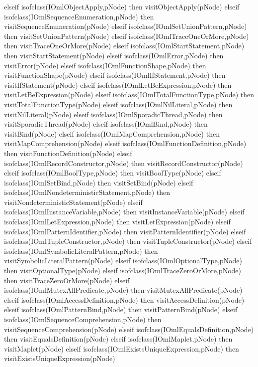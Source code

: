\begin{vdm_al}
      elseif isofclass(IOmlObjectApply,pNode) then visitObjectApply(pNode)
      elseif isofclass(IOmlSequenceEnumeration,pNode) then visitSequenceEnumeration(pNode)
      elseif isofclass(IOmlSetUnionPattern,pNode) then visitSetUnionPattern(pNode)
      elseif isofclass(IOmlTraceOneOrMore,pNode) then visitTraceOneOrMore(pNode)
      elseif isofclass(IOmlStartStatement,pNode) then visitStartStatement(pNode)
      elseif isofclass(IOmlError,pNode) then visitError(pNode)
      elseif isofclass(IOmlFunctionShape,pNode) then visitFunctionShape(pNode)
      elseif isofclass(IOmlIfStatement,pNode) then visitIfStatement(pNode)
      elseif isofclass(IOmlLetBeExpression,pNode) then visitLetBeExpression(pNode)
      elseif isofclass(IOmlTotalFunctionType,pNode) then visitTotalFunctionType(pNode)
      elseif isofclass(IOmlNilLiteral,pNode) then visitNilLiteral(pNode)
      elseif isofclass(IOmlSporadicThread,pNode) then visitSporadicThread(pNode)
      elseif isofclass(IOmlBind,pNode) then visitBind(pNode)
      elseif isofclass(IOmlMapComprehension,pNode) then visitMapComprehension(pNode)
      elseif isofclass(IOmlFunctionDefinition,pNode) then visitFunctionDefinition(pNode)
      elseif isofclass(IOmlRecordConstructor,pNode) then visitRecordConstructor(pNode)
      elseif isofclass(IOmlBoolType,pNode) then visitBoolType(pNode)
      elseif isofclass(IOmlSetBind,pNode) then visitSetBind(pNode)
      elseif isofclass(IOmlNondeterministicStatement,pNode) then visitNondeterministicStatement(pNode)
      elseif isofclass(IOmlInstanceVariable,pNode) then visitInstanceVariable(pNode)
      elseif isofclass(IOmlLetExpression,pNode) then visitLetExpression(pNode)
      elseif isofclass(IOmlPatternIdentifier,pNode) then visitPatternIdentifier(pNode)
      elseif isofclass(IOmlTupleConstructor,pNode) then visitTupleConstructor(pNode)
      elseif isofclass(IOmlSymbolicLiteralPattern,pNode) then visitSymbolicLiteralPattern(pNode)
      elseif isofclass(IOmlOptionalType,pNode) then visitOptionalType(pNode)
      elseif isofclass(IOmlTraceZeroOrMore,pNode) then visitTraceZeroOrMore(pNode)
      elseif isofclass(IOmlMutexAllPredicate,pNode) then visitMutexAllPredicate(pNode)
      elseif isofclass(IOmlAccessDefinition,pNode) then visitAccessDefinition(pNode)
      elseif isofclass(IOmlPatternBind,pNode) then visitPatternBind(pNode)
      elseif isofclass(IOmlSequenceComprehension,pNode) then visitSequenceComprehension(pNode)
      elseif isofclass(IOmlEqualsDefinition,pNode) then visitEqualsDefinition(pNode)
      elseif isofclass(IOmlMaplet,pNode) then visitMaplet(pNode)
      elseif isofclass(IOmlExistsUniqueExpression,pNode) then visitExistsUniqueExpression(pNode)

\end{vdm_al}
